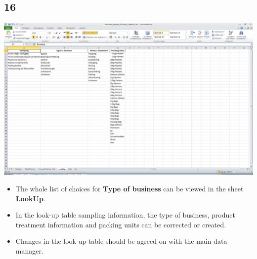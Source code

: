 \documentclass{beamer}
\begin{document}
\subsection{16}
\begin{frame}
	\begin{center}
  		\includegraphics[height=0.6\textheight]{16.png}
	\end{center}
	\begin{itemize}
		\item The whole list of choices for \textbf{Type of business} can be viewed in the sheet \textbf{LookUp}.
		\item In the look-up table sampling information, the type of business, product treatment information and packing units can be corrected or created.
		\item Changes in the look-up table should be agreed on with the main data manager.
	\end{itemize}
\end{frame}
\end{document}
